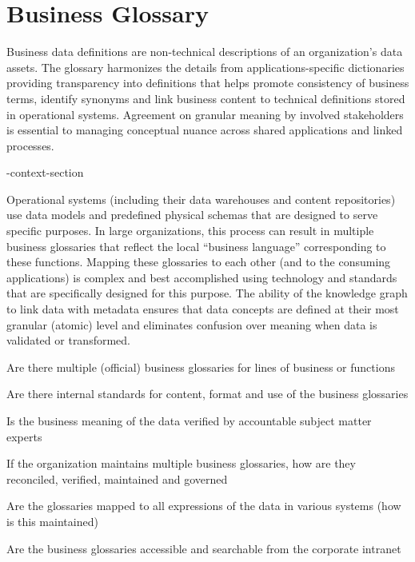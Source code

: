 \section{Business Glossary}\label{sec:ekgmm-b-2-4} %

Business data definitions are non-technical descriptions of an organization’s data assets.
The glossary harmonizes the details from applications-specific dictionaries providing transparency into definitions
that helps promote consistency of business terms, identify synonyms and link business content to technical
definitions stored in operational systems.
Agreement on granular meaning by involved stakeholders is essential to managing conceptual nuance across
shared applications and linked processes.

\ekgmm-context-section

Operational systems (including their data warehouses and content repositories) use data models and predefined
physical schemas that are designed to serve specific purposes.
In large organizations, this process can result in multiple business glossaries that reflect the
local “business language” corresponding to these functions.
Mapping these glossaries to each other (and to the consuming applications) is complex and best accomplished
using technology and standards that are specifically designed for this purpose.
The ability of the knowledge graph to link data with metadata ensures that data concepts are defined at their
most granular (atomic) level and eliminates confusion over meaning when data is validated or transformed.

\kgmmcorequestionssection

\begin{core-questions}

  \item [\thesection.1] Are there multiple (official) business glossaries for lines of business or functions
  \item [\thesection.2] Are there internal standards for content, format and use of the business glossaries
  \item [\thesection.3] Is the business meaning of the data verified by accountable subject matter experts
  \item [\thesection.4] If the organization maintains multiple business glossaries, how are they reconciled,
                        verified, maintained and governed
  \item [\thesection.5] Are the glossaries mapped to all expressions of the data in various systems
                        (how is this maintained)
  \item [\thesection.4] Are the business glossaries accessible and searchable from the corporate intranet

\end{core-questions}

